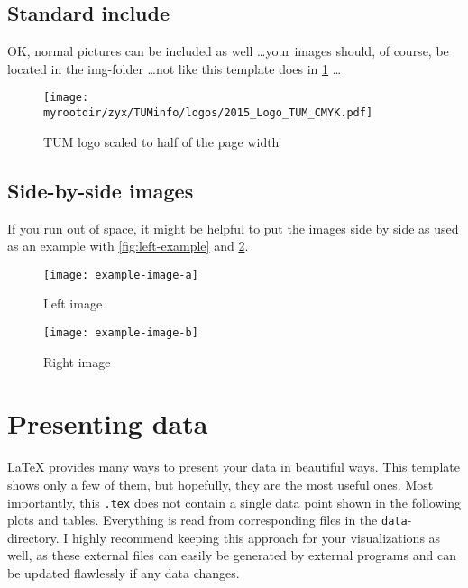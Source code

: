 \documentclass[\myrootdir/main.tex]{subfiles}
\begin{document}
\subsection{Standard include}

OK, normal pictures can be included as well \ldots your images should, of course, be located in the img-folder \ldots not like this template does in \cref{fig:selogo} \ldots

\begin{figure}[htb]
\centering
\texttt{[image: \\myrootdir/zyx/TUMinfo/logos/2015\_Logo\_TUM\_CMYK.pdf]}
\caption{TUM logo scaled to half of the page width}
\label{fig:selogo}
\end{figure}

\newpage

\subsection{Side-by-side images}

If you run out of space, it might be helpful to put the images side by side as used as an example with \cref{fig:left-example} and \cref{fig:right-example}.

\begin{figure}[htb]
\centering
\begin{minipage}{0.46\textwidth}
\texttt{[image: example-image-a]}
\caption{Left image}
\label{fig:left-example}
\end{minipage}
\qquad
\begin{minipage}{0.46\textwidth}
\texttt{[image: example-image-b]}
\caption{Right image}
\label{fig:right-example}
\end{minipage}
\end{figure}


\section{Presenting data}
\label{sec:presenting-data}

LaTeX provides many ways to present your data in beautiful ways.
This template shows only a few of them, but hopefully, they are the most useful ones.
Most importantly, this \texttt{.tex} does not contain a single data point shown in the following plots and tables.
Everything is read from corresponding files in the \texttt{data}-directory.
I highly recommend keeping this approach for your visualizations as well, as these external files can easily be generated by external programs and can be updated flawlessly if any data changes.
\end{document}

